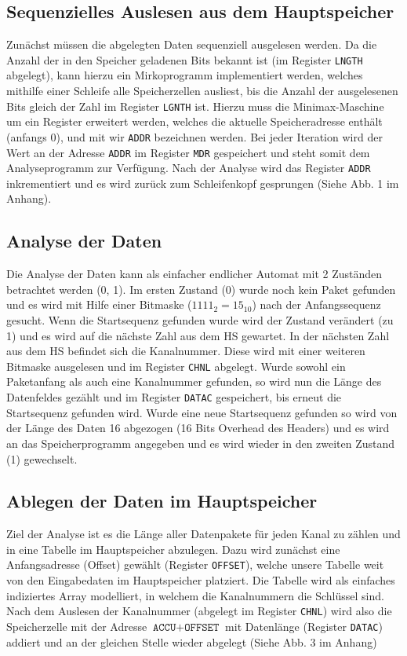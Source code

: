 \documentclass[12pt,titlepage]{article}
\begin{document}
\subsection{Sequenzielles Auslesen aus dem Hauptspeicher}
Zun{\"a}chst m{\"u}ssen die abgelegten Daten sequenziell ausgelesen werden. Da die Anzahl der in den Speicher geladenen Bits
bekannt ist (im Register \texttt{LNGTH} abgelegt), kann hierzu ein Mirkoprogramm implementiert werden, welches mithilfe
einer Schleife alle Speicherzellen ausliest, bis die Anzahl der ausgelesenen Bits gleich der Zahl im Register \texttt{LGNTH} ist.
Hierzu muss die Minimax-Maschine um ein Register erweitert werden, welches die aktuelle Speicheradresse enth{\"a}lt (anfangs 0),
und mit wir \texttt{ADDR} bezeichnen werden. Bei jeder Iteration wird der Wert an der Adresse \texttt{ADDR} im Register 
\texttt{MDR} gespeichert und steht somit dem Analyseprogramm zur Verf{\"u}gung. Nach der Analyse wird das Register \texttt{ADDR}
inkrementiert und es wird zur{\"u}ck zum Schleifenkopf gesprungen (Siehe Abb. 1 im Anhang).

\subsection{Analyse der Daten}
Die Analyse der Daten kann als einfacher endlicher Automat mit 2 Zuständen betrachtet werden (0, 1). Im ersten Zustand (0)
wurde noch kein Paket gefunden und es wird mit Hilfe einer Bitmaske ($1111_{2} = 15_{10}$) nach der Anfangssequenz gesucht. 
Wenn die Startsequenz gefunden wurde wird der Zustand verändert (zu 1) und es wird auf die nächste Zahl aus dem HS gewartet. 
In der nächsten Zahl aus dem HS befindet sich die Kanalnummer. Diese wird mit einer weiteren Bitmaske ausgelesen
und im Register \texttt{CHNL} abgelegt.
Wurde sowohl ein Paketanfang als auch eine Kanalnummer gefunden, so wird nun die Länge des Datenfeldes gezählt und im Register \texttt{DATAC} gespeichert, bis erneut die Startsequenz gefunden wird.
Wurde eine neue Startsequenz gefunden so wird von der Länge des Daten 16 abgezogen (16 Bits Overhead des Headers) und
es wird an das Speicherprogramm angegeben und es wird wieder in den zweiten Zustand (1) gewechselt.

\subsection{Ablegen der Daten im Hauptspeicher}
Ziel der Analyse ist es die Länge aller Datenpakete für jeden Kanal zu z{\"a}hlen und in eine Tabelle im Hauptspeicher abzulegen.
Dazu wird zunächst eine Anfangsadresse (Offset) gewählt (Register \texttt{OFFSET}), welche unsere Tabelle weit von den Eingabedaten
im Hauptspeicher platziert. Die Tabelle wird als einfaches indiziertes Array modelliert, in welchem die Kanalnummern die
Schlüssel sind. Nach dem Auslesen der Kanalnummer (abgelegt im Register \texttt{CHNL}) wird also die Speicherzelle mit der Adresse 
$\texttt{ACCU} + \texttt{OFFSET}$ mit Datenlänge (Register \texttt{DATAC}) addiert und an der gleichen Stelle wieder abgelegt (Siehe
Abb. 3 im Anhang)
\end{document}
